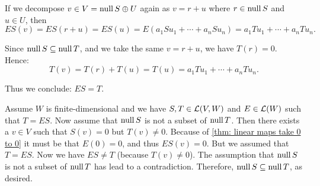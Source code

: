 \begin{xrcs}
\begin{xprf}
   If we decompose $v \in V = \operatorname{null} S \oplus U$ again as $v = r + u$ where  $r \in \operatorname{null} S$ and $u \in U$, then
   \begin{equation}
     ES ( v ) = ES ( r + u) = ES( u) = E (a_1 S u_1 + \cdots + a_n S u_n) = a_1 T u_1 + \cdots + a_n T u_n.
   \end{equation}

   Since $\operatorname{null} S \subseteq \operatorname{null} T$, and we take the same $v=r+u$, we have $T(r)=0$. Hence:
   \begin{equation}
     T(v) = T(r) + T(u) = T(u) = a_1 T u_1 + \cdots + a_n T u_n.
   \end{equation}

   Thus we conclude: $ES=T$.

   \Leftarrowdirection Assume $W$ is finite-dimensional and we have $S,T \in \mathcal{L}(V,W)$ and $E \in \mathcal{L} (W)$ such that $T=ES$. Now assume that $\operatorname{null} S$ is not a subset of $\operatorname{null} T$. Then there exists a $v \in V$ such that $S(v) = 0$ but $T(v) \neq 0$. Because of \ref{thm: linear maps take 0 to 0} it must be that $E(0) = 0$, and thus $ES(v) = 0$. But we assumed that $T=ES$. Now we have $ES \neq T$ (because $T(v)\neq 0$). The assumption that $\operatorname{null} S$ is not a subset of $\operatorname{null} T$ has lead to a contradiction. Therefore, $\operatorname{null} S \subseteq \operatorname{null} T$, as desired.
  \end{xprf}
\end{xrcs}

